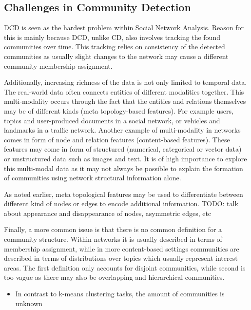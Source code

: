 \documentclass[
acmsmall,
nonacm,
screen,
acmthm]{../../scripts/pandoc/templates/acmart}
\providecommand{\tightlist}{%
\setlength{\itemsep}{0pt}\setlength{\parskip}{0pt}}
\begin{document}
\hypertarget{challenges-in-community-detection}{%
\subsection{Challenges in Community
Detection}\label{challenges-in-community-detection}}

DCD is seen as the hardest problem within Social Network Analysis.
Reason for this is mainly because DCD, unlike CD, also involves tracking
the found communities over time. This tracking relies on consistency of
the detected communities as usually slight changes to the network may
cause a different community membership assignment.

Additionally, increasing richness of the data is not only limited to
temporal data. The real-world data often connects entities of different
modalities together. This multi-modality occurs through the fact that
the entities and relations themselves may be of different kinds (meta
topology-based features). For example users, topics and user-produced
documents in a social network, or vehicles and landmarks in a traffic
network. Another example of multi-modality in networks comes in form of
node and relation features (content-based features). These features may
come in form of structured (numerical, categorical or vector data) or
unstructured data such as images and text. It is of high importance to
explore this multi-modal data as it may not always be possible to
explain the formation of communities using network structural
information alone.

As noted earlier, meta topological features may be used to differentiate
between different kind of nodes or edges to encode additional
information. TODO: talk about appearance and disappearance of nodes,
asymmetric edges, etc

Finally, a more common issue is that there is no common definition for a
community structure. Within networks it is usually described in terms of
membership assignment, while in more content-based settings communities
are described in terms of distributions over topics which usually
represent interest areas. The first definition only accounts for
disjoint communities, while second is too vague as there may also be
overlapping and hierarchical communities.

\begin{itemize}
\tightlist
\item
  In contrast to k-means clustering tasks, the amount of communities is
  unknown
\end{itemize}
\end{document}
